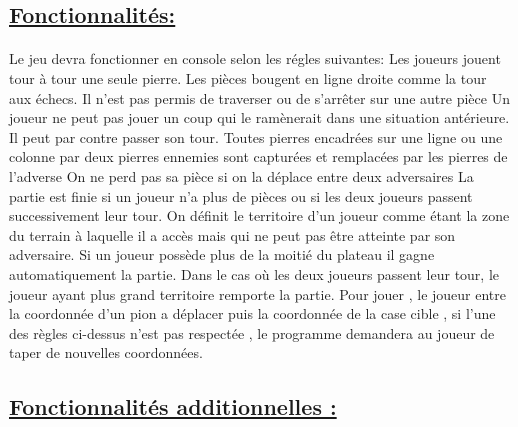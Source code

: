 \documentclass[a4paper,12pt]{article}
\begin{document}
\subsection{\underline{Fonctionnalités:}}
\paragraph{}
Le jeu devra fonctionner en console selon les régles suivantes:
\newline
Les joueurs jouent tour à tour une seule pierre. Les pièces bougent en ligne droite comme
la tour aux échecs. Il n’est pas permis de traverser ou de s’arrêter sur une autre pièce
\newline
\newline
Un joueur ne peut pas jouer un coup qui le ramènerait dans une situation antérieure.
Il peut par contre passer son tour.
\newline
\newline
Toutes pierres encadrées sur une ligne ou une colonne par deux pierres ennemies sont
capturées et remplacées par les pierres de l’adverse
\newline
On ne perd pas sa pièce si on la déplace entre deux adversaires 
\newline
\newline
La partie est finie si un joueur n’a plus de pièces ou si les deux joueurs passent successivement
leur tour.
\newline
\newline
On définit le territoire d’un joueur comme étant la zone du terrain à laquelle il a accès
mais qui ne peut pas être atteinte par son adversaire. Si un joueur possède plus de la
moitié du plateau il gagne automatiquement la partie.
\newline
Dans le cas où les deux joueurs passent leur tour, le joueur ayant plus grand territoire
remporte la partie.
\newline
\newline
Pour jouer , le joueur entre la coordonnée d'un pion a déplacer puis la coordonnée de la case cible , si l'une des règles ci-dessus n'est pas respectée , le programme demandera au joueur de taper de nouvelles coordonnées.

\subsection{\underline{Fonctionnalités additionnelles :}}
\end{document}
